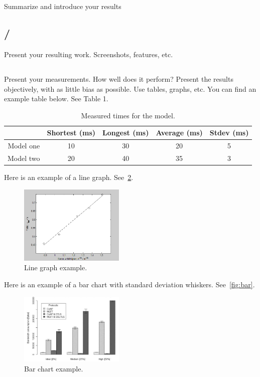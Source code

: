 \section{}\label{sec:results}
Summarize and introduce your results

\subsection{/}\label{subsec:resultapp}
Present your resulting work. Screenshots, features, etc.

\subsection{}\label{subsec:measurementresults}
Present your measurements. How well does it perform? Present the results objectively, with as little
bias as possible. Use tables, graphs, etc.  You can find an example table below. See Table 1.

\begin{table}
  \caption{Measured times for the model.}
  \begin{tabular}{c c c c c}
              & Shortest (ms) & Longest (ms) & Average (ms) & Stdev (ms)\\
    \toprule
    Model one & 10 & 30 & 20 & 5 \\
    \midrule 
    Model two & 20 & 40 & 35 & 3 \\
    \bottomrule
  \end{tabular}
\end{table}

Here is an example of a line graph. See~\cref{fig:line}.
\begin{figure}
  \includegraphics[width=5cm]{Figures/graph1.png}
  \caption{Line graph example.}\label{fig:line}
\end{figure}

Here is an example of a bar chart with standard deviation whiskers. See~\cref{fig:bar}.
\begin{figure}
  \includegraphics[width=5cm]{Figures/graph2.png}
  \caption{Bar chart example.}\label{fig:line}
\end{figure}

